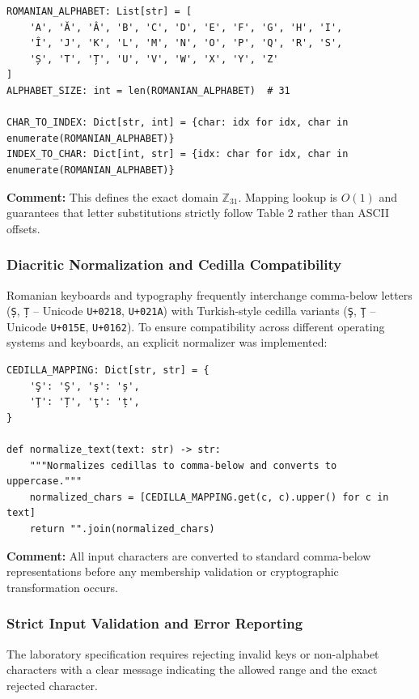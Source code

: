 \documentclass{labreport}
\begin{document}
\begin{lstlisting}[style=python]
ROMANIAN_ALPHABET: List[str] = [
    'A', 'Ă', 'Â', 'B', 'C', 'D', 'E', 'F', 'G', 'H', 'I',
    'Î', 'J', 'K', 'L', 'M', 'N', 'O', 'P', 'Q', 'R', 'S',
    'Ș', 'T', 'Ț', 'U', 'V', 'W', 'X', 'Y', 'Z'
]
ALPHABET_SIZE: int = len(ROMANIAN_ALPHABET)  # 31

CHAR_TO_INDEX: Dict[str, int] = {char: idx for idx, char in enumerate(ROMANIAN_ALPHABET)}
INDEX_TO_CHAR: Dict[int, str] = {idx: char for idx, char in enumerate(ROMANIAN_ALPHABET)}
\end{lstlisting}
\textbf{Comment:} This defines the exact domain $\mathbb{Z}_{31}$. Mapping lookup is $O(1)$ and guarantees that letter substitutions strictly follow Table 2 rather than ASCII offsets.

\subsubsection{Diacritic Normalization and Cedilla Compatibility}
Romanian keyboards and typography frequently interchange comma-below letters (\texttt{Ș}, \texttt{Ț} -- Unicode \texttt{U+0218}, \texttt{U+021A}) with Turkish-style cedilla variants (\texttt{Ş}, \texttt{Ţ} -- Unicode \texttt{U+015E}, \texttt{U+0162}). To ensure compatibility across different operating systems and keyboards, an explicit normalizer was implemented:

\begin{lstlisting}[style=python]
CEDILLA_MAPPING: Dict[str, str] = {
    'Ş': 'Ș', 'ş': 'ș',
    'Ţ': 'Ț', 'ţ': 'ț',
}

def normalize_text(text: str) -> str:
    """Normalizes cedillas to comma-below and converts to uppercase."""
    normalized_chars = [CEDILLA_MAPPING.get(c, c).upper() for c in text]
    return "".join(normalized_chars)
\end{lstlisting}
\textbf{Comment:} All input characters are converted to standard comma-below representations before any membership validation or cryptographic transformation occurs.

\subsubsection{Strict Input Validation and Error Reporting}
The laboratory specification requires rejecting invalid keys or non-alphabet characters with a clear message indicating the allowed range and the exact rejected character.
\end{document}
